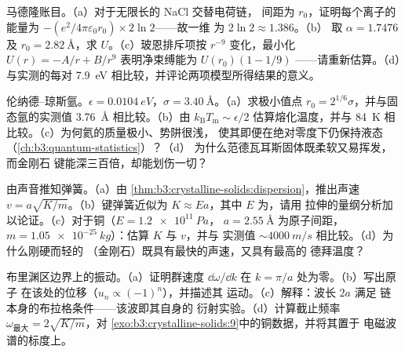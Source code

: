 \begin{exercise}[$\star\star$]\label{exo:b3:crystalline-solids:7}
马德隆账目。（a）对于无限长的 NaCl 交替电荷链，
间距为 $r_0$，证明每个离子的能量为
$-(e^2/4\pi\varepsilon_0r_0)\times2\ln2$——故一维
为 $2\ln2 \approx 1.386$。（b）
取 $\alpha = 1.7476$ 及 $r_0 = \qty{2.82}{\angstrom}$，求
$U$。（c）玻恩排斥项按 $r^{-9}$ 变化，最小化
$U(r) = -A/r + B/r^9$ 表明净束缚能为 $U(r_0)(1 - 1/9)$
——请重新估算。（d）与实测的每对
\qty{7.9}{eV} 相比较，并评论两项模型所得结果的意义。
\end{exercise}

\begin{exercise}[$\star\star$]\label{exo:b3:crystalline-solids:8}
伦纳德–琼斯氩。$\epsilon = \qty{0.0104}{eV}$，$\sigma =
\qty{3.40}{\angstrom}$。（a）求极小值点 $r_0 = 2^{1/6}
\sigma$，并与固态氩的实测值
\qty{3.76}{\angstrom} 相比较。（b）由
$k_{\text{B}}T_{\text{m}} \sim \epsilon/2$ 估算熔化温度，并与
\qty{84}{K} 相比较。（c）为何氦的质量极小、势阱很浅，
使其即便在绝对零度下仍保持液态（\cref{ch:b3:quantum-statistics}）？（d）
为什么范德瓦耳斯固体既柔软又易挥发，而金刚石
键能深三百倍，却能划伤一切？
\end{exercise}

\begin{exercise}[$\star\star$]\label{exo:b3:crystalline-solids:9}
由声音推知弹簧。（a）由
\cref{thm:b3:crystalline-solids:dispersion}，推出声速
$v = a\sqrt{K/m}$。（b）键弹簧近似为 $K \approx
Ea$，其中 $E$ 为，请用
拉伸的量纲分析加以论证。（c）对于铜（$E = \qty{1.2e11}{Pa}$，
$a = \qty{2.55}{\angstrom}$ 为原子间距，$m =
\qty{1.05e-25}{kg}$）：估算 $K$ 与 $v$，并与
实测值 $\sim\qty{4000}{m/s}$ 相比较。（d）为什么刚硬而轻的
（金刚石）既具有最快的声速，又具有最高的
德拜温度？
\end{exercise}

\begin{exercise}[$\star\star\star$]\label{exo:b3:crystalline-solids:10}
布里渊区边界上的振动。（a）证明群速度
$\dd\omega/\dd k$ 在 $k = \pi/a$ 处为零。（b）写出原子
在该处的位移（$u_n \propto (-1)^n$），并描述其
运动。（c）解释：波长 $2a$ 满足
链本身的布拉格条件——该波即其自身的
衍射实验。（d）计算截止频率
$\omega_{\text{最大}} = 2\sqrt{K/m}$，对
\cref{exo:b3:crystalline-solids:9}中的铜数据，并将其置于
电磁波谱的标度上。
\end{exercise}

